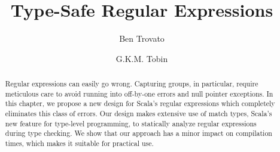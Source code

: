 \documentclass[sigplan,screen,anonymous,review,nonacm,]{acmart} %
\begin{document}
\title{Type-Safe Regular Expressions}

\author{Ben Trovato}
\author{G.K.M. Tobin}
\authornotemark[1]

\begin{abstract}
Regular expressions can easily go wrong.
Capturing groups, in particular, require meticulous care to avoid running into off-by-one errors and null pointer exceptions.
In this chapter, we propose a new design for Scala's regular expressions which completely eliminates this class of errors.
Our design makes extensive use of match types, Scala's new feature for type-level programming, to statically analyze regular expressions during type checking.
We show that our approach has a minor impact on compilation times, which makes it suitable for practical use.
\end{abstract}

\end{document}
